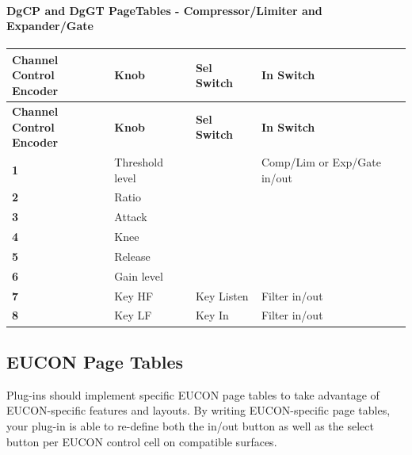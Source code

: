 \hypertarget{a00833_aax_page_table_guide_04_avid_center_section_page_tables_venue_s3l_mapping_DgCP_DgGT}{}\paragraph{\textquotesingle{}\+Dg\+C\+P\textquotesingle{} and \textquotesingle{}\+Dg\+G\+T\textquotesingle{} Page\+Tables -\/ Compressor/\+Limiter and Expander/\+Gate}\label{a00833_aax_page_table_guide_04_avid_center_section_page_tables_venue_s3l_mapping_DgCP_DgGT}
 \tabulinesep=1mm
\begin{longtabu}spread 0pt [c]{*{4}{|X[-1]}|}
\hline
\cellcolor{\tableheadbgcolor}\textbf{ Channel Control~\newline
Encoder }&\cellcolor{\tableheadbgcolor}\textbf{ Knob }&\cellcolor{\tableheadbgcolor}\textbf{ Sel Switch }&\cellcolor{\tableheadbgcolor}\textbf{ In Switch  }\\
\endfirsthead
\hline
\endfoot
\hline
\cellcolor{\tableheadbgcolor}\textbf{ Channel Control~\newline
Encoder }&\cellcolor{\tableheadbgcolor}\textbf{ Knob }&\cellcolor{\tableheadbgcolor}\textbf{ Sel Switch }&\cellcolor{\tableheadbgcolor}\textbf{ In Switch  }\\
\endhead
\cellcolor{\tableheadbgcolor}\textbf{ 1 }&Threshold level &&Comp/\+Lim or Exp/\+Gate in/out  \\
\cellcolor{\tableheadbgcolor}\textbf{ 2 }&Ratio &&\\
\cellcolor{\tableheadbgcolor}\textbf{ 3 }&Attack &&\\
\cellcolor{\tableheadbgcolor}\textbf{ 4 }&Knee &&\\
\cellcolor{\tableheadbgcolor}\textbf{ 5 }&Release &&\\
\cellcolor{\tableheadbgcolor}\textbf{ 6 }&Gain level &&\\
\cellcolor{\tableheadbgcolor}\textbf{ 7 }&Key HF &Key Listen &Filter in/out  \\
\cellcolor{\tableheadbgcolor}\textbf{ 8 }&Key LF &Key In &Filter in/out  \\
\end{longtabu}






\hypertarget{a00833_aax_page_table_guide__eucon_page_tables}{}\subsection{E\+U\+C\+O\+N Page Tables}\label{a00833_aax_page_table_guide__eucon_page_tables}
Plug-\/ins should implement specific E\+U\+C\+ON page tables to take advantage of E\+U\+C\+O\+N-\/specific features and layouts. By writing E\+U\+C\+O\+N-\/specific page tables, your plug-\/in is able to re-\/define both the in/out button as well as the select button per E\+U\+C\+ON control cell on compatible surfaces.

